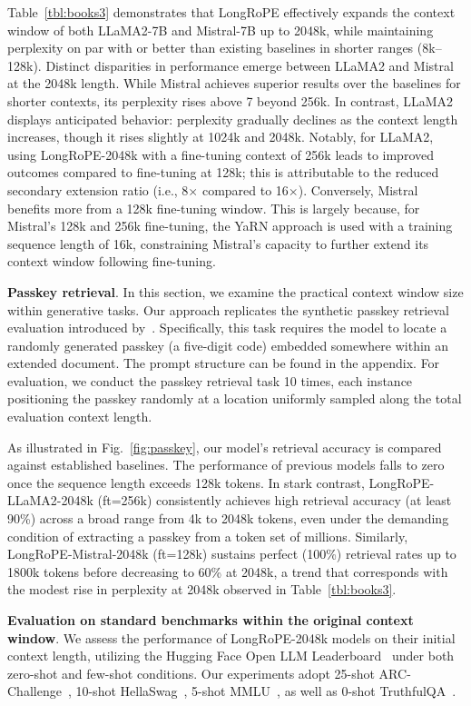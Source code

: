 Table~\ref{tbl:books3} demonstrates that LongRoPE effectively expands the context window of both LLaMA2-7B and Mistral-7B up to 2048k, while maintaining perplexity on par with or better than existing baselines in shorter ranges (8k–128k). Distinct disparities in performance emerge between LLaMA2 and Mistral at the 2048k length. While Mistral achieves superior results over the baselines for shorter contexts, its perplexity rises above 7 beyond 256k. In contrast, LLaMA2 displays anticipated behavior: perplexity gradually declines as the context length increases, though it rises slightly at 1024k and 2048k. Notably, for LLaMA2, using LongRoPE-2048k with a fine-tuning context of 256k leads to improved outcomes compared to fine-tuning at 128k; this is attributable to the reduced secondary extension ratio (i.e., 8$\times$ compared to 16$\times$). Conversely, Mistral benefits more from a 128k fine-tuning window. This is largely because, for Mistral's 128k and 256k fine-tuning, the YaRN approach is used with a training sequence length of 16k, constraining Mistral's capacity to further extend its context window following fine-tuning.

\textbf{Passkey retrieval}. In this section, we examine the practical context window size within generative tasks. Our approach replicates the synthetic passkey retrieval evaluation introduced by~\cite{passkey}. Specifically, this task requires the model to locate a randomly generated passkey (a five-digit code) embedded somewhere within an extended document. The prompt structure can be found in the appendix. For evaluation, we conduct the passkey retrieval task 10 times, each instance positioning the passkey randomly at a location uniformly sampled along the total evaluation context length.

As illustrated in Fig.~\ref{fig:passkey}, our model’s retrieval accuracy is compared against established baselines. The performance of previous models falls to zero once the sequence length exceeds 128k tokens. In stark contrast, LongRoPE-LLaMA2-2048k (ft=256k) consistently achieves high retrieval accuracy (at least 90\%) across a broad range from 4k to 2048k tokens, even under the demanding condition of extracting a passkey from a token set of millions. Similarly, LongRoPE-Mistral-2048k (ft=128k) sustains perfect (100\%) retrieval rates up to 1800k tokens before decreasing to 60\% at 2048k, a trend that corresponds with the modest rise in perplexity at 2048k observed in Table~\ref{tbl:books3}.

\textbf{Evaluation on standard benchmarks within the original context window}. We assess the performance of LongRoPE-2048k models on their initial context length, utilizing the Hugging Face Open LLM Leaderboard~\cite{huggingfaceboard} under both zero-shot and few-shot conditions. Our experiments adopt 25-shot ARC-Challenge~\cite{allenai:arc}, 10-shot HellaSwag~\cite{zellers2019hellaswag}, 5-shot MMLU~\cite{mmlu}, as well as 0-shot TruthfulQA~\cite{lin2021truthfulqa}.

